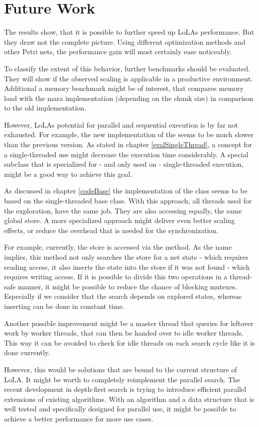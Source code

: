 \chapter{Future Work}
The results show, that it is possible to further speed up LoLAs performance. But they draw not the complete picture. Using different optimization methods and other Petri nets, the performance gain will most certainly ease noticeably.

To classify the extent of this behavior, further benchmarks should be evaluated. They will show if the observed scaling is applicable in a productive environment. Additional a memory benchmark might be of interest, that compares memory load with the mara implementation (depending on the chunk size) in comparison to the old implementation.

However, LoLAs potential for parallel and sequential execution is by far not exhausted. For example, the new implementation of the  seems to be much slower than the previous version. As stated in chapter \ref{evalSingleThread}, a concept for a single-threaded use might decrease the execution time considerably. A special subclass that is specialized for - and only used on - single-threaded execution, might be a good way to achieve this goal.

As discussed in chapter \ref{codeBase} the implementation of the  class seems to be based on the single-threaded base class. With this approach, all threads used for the exploration, have the same job. They are also accessing equally, the same global store. A more specialized approach might deliver even better scaling effects, or reduce the overhead that is needed for the synchronization.

For example, currently, the store is accessed via the  method. As the name implies, this method not only searches the store for a net state - which requires reading access, it also inserts the state into the store if it was not found - which requires writing access. If it is possible to divide this two operations in a thread-safe manner, it might be possible to reduce the chance of blocking mutexes. Especially if we consider that the search depends on explored states, whereas inserting can be done in constant time.

Another possible improvement might be a master thread that queries for leftover work by worker threads, that can then be handed over to idle worker threads. This way it can be avoided to check for idle threads on each search cycle like it is done currently.

However, this would be solutions that are bound to the current structure of LoLA. It might be worth to completely reimplement the parallel search. The recent development in depth-first search is trying to introduce efficient parallel extensions of existing algorithms\cite{bloemen2016multi}\cite{holzmann2008stack}. With an algorithm and a data structure that is well tested and specifically designed for parallel use, it might be possible to achieve a better performance for more use cases.